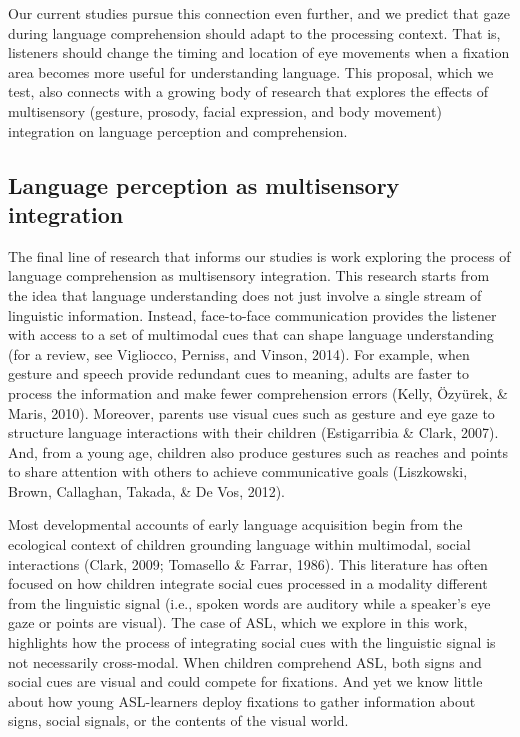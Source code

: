 \documentclass[,man,floatsintext]{apa6}
\begin{document}
Our current studies pursue this connection even further, and we predict that gaze during language comprehension should adapt to the processing context. That is, listeners should change the timing and location of eye movements when a fixation area becomes more useful for understanding language. This proposal, which we test, also connects with a growing body of research that explores the effects of multisensory (gesture, prosody, facial expression, and body movement) integration on language perception and comprehension.

\hypertarget{language-perception-as-multisensory-integration}{%
\subsection{Language perception as multisensory integration}\label{language-perception-as-multisensory-integration}}

The final line of research that informs our studies is work exploring the process of language comprehension as multisensory integration. This research starts from the idea that language understanding does not just involve a single stream of linguistic information. Instead, face-to-face communication provides the listener with access to a set of multimodal cues that can shape language understanding (for a review, see Vigliocco, Perniss, and Vinson, 2014). For example, when gesture and speech provide redundant cues to meaning, adults are faster to process the information and make fewer comprehension errors (Kelly, Özyürek, \& Maris, 2010). Moreover, parents use visual cues such as gesture and eye gaze to structure language interactions with their children (Estigarribia \& Clark, 2007). And, from a young age, children also produce gestures such as reaches and points to share attention with others to achieve communicative goals (Liszkowski, Brown, Callaghan, Takada, \& De Vos, 2012).

Most developmental accounts of early language acquisition begin from the ecological context of children grounding language within multimodal, social interactions (Clark, 2009; Tomasello \& Farrar, 1986). This literature has often focused on how children integrate social cues processed in a modality different from the linguistic signal (i.e., spoken words are auditory while a speaker's eye gaze or points are visual). The case of ASL, which we explore in this work, highlights how the process of integrating social cues with the linguistic signal is not necessarily cross-modal. When children comprehend ASL, both signs and social cues are visual and could compete for fixations. And yet we know little about how young ASL-learners deploy fixations to gather information about signs, social signals, or the contents of the visual world.
\end{document}
